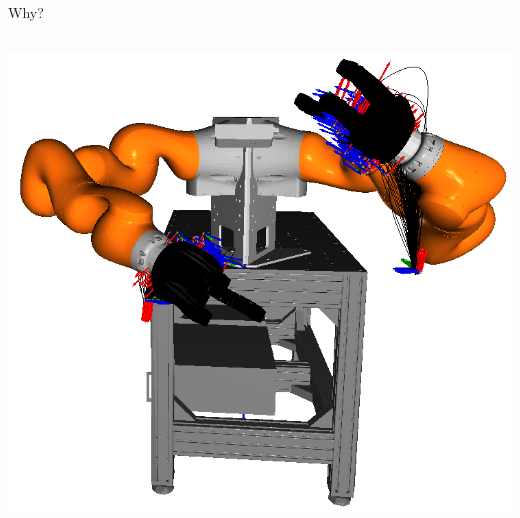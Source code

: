 \documentclass[14pt,aspectratio=169]{beamer}
\begin{document}
\begin{frame}{Why?}
\begin{columns}
\begin{column}{0.6\textwidth}
\includegraphics[width=\textwidth]{images/kuka_trajectories}
\end{column}
\end{columns}
\end{frame}

\end{document}
